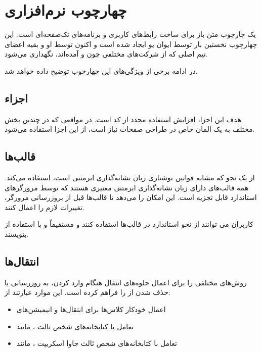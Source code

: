 {\section{چهارچوب نرم‌افزاری }
\cite{Vue} یک چارچوب متن باز  برای ساخت رابط‌های کاربری و برنامه‌های تک‌صفحه‌ای است. این چهارچوب نخستین بار توسط ایوان یو ایجاد شده است و اکنون توسط او و بقیه اعضای تیم اصلی که از شرکت‌های مختلفی چون  و  آمده‌اند، نگهداری می‌شود.

در ادامه برخی از ویژگی‌های این چهارچوب توضیح داده خواهد شد.

\subsection{اجزاء}
هدف این اجزا، افزایش استفاده مجدد از کد است. در مواقعی که در چندین بخش مختلف به یک المان خاص در طراحی صفحات نیاز است، از این اجزا استفاده می‌شود.

\subsection{قالب‌ها}
 از یک نحو که مشابه قوانین نوشتاری زبان نشانه‌گذاری ابرمتنی است، استفاده می‌کند. همه قالب‌های  دارای زبان نشانه‌گذاری ابرمتنی معتبری هستند که توسط مرورگرهای استاندارد قابل تجزیه است.  این امکان را می‌دهد تا قالب‌ها قبل از بروزرسانی مرورگر، تغییرات لازم را اعمال کنند.

کاربران  می توانند از نحو استاندارد در قالب‌ها استفاده کنند و مستقیماً و با استفاده از  بنویسند.


\subsection{انتقال‌ها}
{} روش‌های مختلفی را برای اعمال جلوه‌های انتقال هنگام وارد کردن، به روزرسانی یا حذف شدن از  را فراهم کرده است. این موارد عبارتند از:

\begin{itemize}
   	\item اعمال خودکار کلاس‌ها برای انتقال‌ها و انیمیشن‌های 
   	\item تعامل با کتابخانه‌های شخص ثالث ، مانند 
   	\item تعامل با کتابخانه‌های شخص ثالث جاوا اسکریپت ، مانند 
\end{itemize}




}
